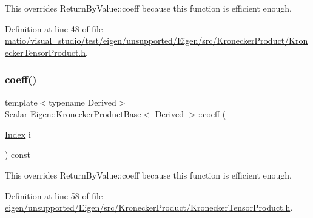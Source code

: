 This overrides Return\+By\+Value\+::coeff because this function is efficient enough. 

Definition at line \hyperlink{matio_2visual__studio_2test_2eigen_2unsupported_2_eigen_2src_2_kronecker_product_2_kronecker_tensor_product_8h_source_l00048}{48} of file \hyperlink{matio_2visual__studio_2test_2eigen_2unsupported_2_eigen_2src_2_kronecker_product_2_kronecker_tensor_product_8h_source}{matio/visual\+\_\+studio/test/eigen/unsupported/\+Eigen/src/\+Kronecker\+Product/\+Kronecker\+Tensor\+Product.\+h}.

\mbox{\label{class_eigen_1_1_kronecker_product_base_a673348e7d9d2a4570aa0bcac33507f7b}} 
\subsubsection{\texorpdfstring{coeff()}{coeff()}\hspace{0.1cm}{\footnotesize\ttfamily [3/4]}}
{\footnotesize\ttfamily template$<$typename Derived$>$ \\
Scalar \hyperlink{class_eigen_1_1_kronecker_product_base}{Eigen\+::\+Kronecker\+Product\+Base}$<$ Derived $>$\+::coeff (\begin{DoxyParamCaption}\item[{\hyperlink{namespace_eigen_a62e77e0933482dafde8fe197d9a2cfde}{Index}}]{i }\end{DoxyParamCaption}) const\hspace{0.3cm}{\ttfamily [inline]}}

This overrides Return\+By\+Value\+::coeff because this function is efficient enough. 

Definition at line \hyperlink{eigen_2unsupported_2_eigen_2src_2_kronecker_product_2_kronecker_tensor_product_8h_source_l00058}{58} of file \hyperlink{eigen_2unsupported_2_eigen_2src_2_kronecker_product_2_kronecker_tensor_product_8h_source}{eigen/unsupported/\+Eigen/src/\+Kronecker\+Product/\+Kronecker\+Tensor\+Product.\+h}.

\mbox{\label{class_eigen_1_1_kronecker_product_base_a673348e7d9d2a4570aa0bcac33507f7b}} 
